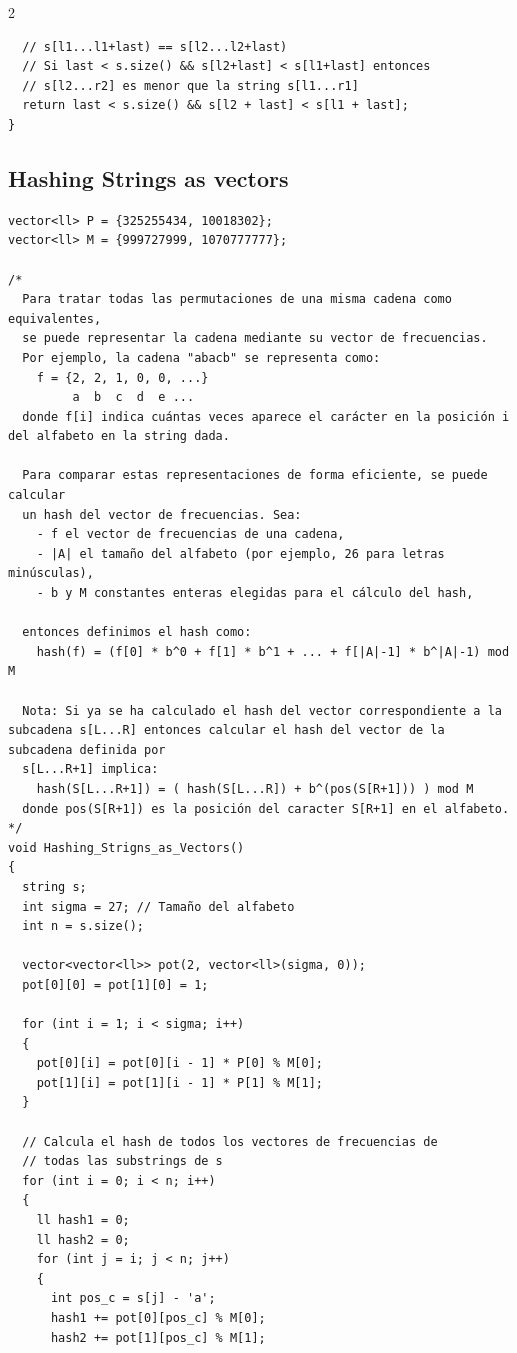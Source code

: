 \documentclass[twoside]{article}
\begin{document}
\begin{multicols*}{2}
\begin{verbatim}
  // s[l1...l1+last) == s[l2...l2+last)
  // Si last < s.size() && s[l2+last] < s[l1+last] entonces
  // s[l2...r2] es menor que la string s[l1...r1]
  return last < s.size() && s[l2 + last] < s[l1 + last];
}
\end{verbatim}

	{
		\subsection*{Hashing Strings as vectors}
	}
	\begin{verbatim}
vector<ll> P = {325255434, 10018302};
vector<ll> M = {999727999, 1070777777};

/*
  Para tratar todas las permutaciones de una misma cadena como equivalentes,
  se puede representar la cadena mediante su vector de frecuencias.
  Por ejemplo, la cadena "abacb" se representa como:
    f = {2, 2, 1, 0, 0, ...}
         a  b  c  d  e ...
  donde f[i] indica cuántas veces aparece el carácter en la posición i del alfabeto en la string dada.

  Para comparar estas representaciones de forma eficiente, se puede calcular
  un hash del vector de frecuencias. Sea:
    - f el vector de frecuencias de una cadena,
    - |A| el tamaño del alfabeto (por ejemplo, 26 para letras minúsculas),
    - b y M constantes enteras elegidas para el cálculo del hash,

  entonces definimos el hash como:
    hash(f) = (f[0] * b^0 + f[1] * b^1 + ... + f[|A|-1] * b^|A|-1) mod M

  Nota: Si ya se ha calculado el hash del vector correspondiente a la subcadena s[L...R] entonces calcular el hash del vector de la subcadena definida por 
  s[L...R+1] implica:
    hash(S[L...R+1]) = ( hash(S[L...R]) + b^(pos(S[R+1])) ) mod M 
  donde pos(S[R+1]) es la posición del caracter S[R+1] en el alfabeto. 
*/
void Hashing_Strigns_as_Vectors()
{
  string s; 
  int sigma = 27; // Tamaño del alfabeto
  int n = s.size();

  vector<vector<ll>> pot(2, vector<ll>(sigma, 0));
  pot[0][0] = pot[1][0] = 1;

  for (int i = 1; i < sigma; i++)
  {
    pot[0][i] = pot[0][i - 1] * P[0] % M[0];
    pot[1][i] = pot[1][i - 1] * P[1] % M[1];
  }

  // Calcula el hash de todos los vectores de frecuencias de 
  // todas las substrings de s
  for (int i = 0; i < n; i++)
  {
    ll hash1 = 0;
    ll hash2 = 0;
    for (int j = i; j < n; j++)
    {
      int pos_c = s[j] - 'a';
      hash1 += pot[0][pos_c] % M[0];
      hash2 += pot[1][pos_c] % M[1];


\end{verbatim}
\end{multicols*}
\end{document}
